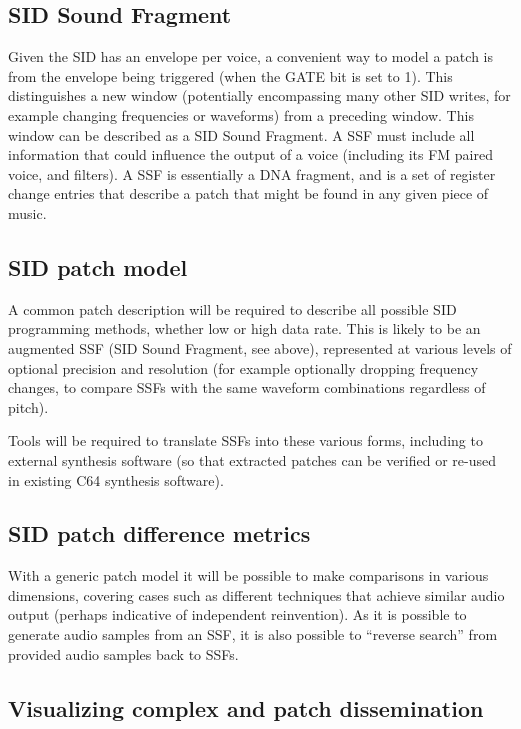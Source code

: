 \documentclass[10pt]{article}
\begin{document}
\begin{multicols*}{2}
\subsection{SID Sound Fragment}
\label{ssf}

Given the SID has an envelope per voice, a convenient way to model a patch is from the envelope being triggered (when the GATE bit is set to 1). This distinguishes a new window (potentially encompassing many other SID writes, for example changing frequencies or waveforms) from a preceding window. This window can be described as a SID Sound Fragment. A SSF must include all information that could influence the output of a voice (including its FM paired voice, and filters). A SSF is essentially a DNA fragment, and is a set of register change entries that describe a patch that might be found in any given piece of music.

\subsection{SID patch model}

A common patch description will be required to describe all possible SID programming methods, whether low or high data rate. This is likely to be an augmented SSF (SID Sound Fragment, see above), represented at various levels of optional precision and resolution (for example optionally dropping frequency changes, to compare SSFs with the same waveform combinations regardless of pitch).

Tools will be required to translate SSFs into these various forms, including to external synthesis software (so that extracted patches can be verified or re-used in existing C64 synthesis software).

\subsection{SID patch difference metrics}

With a generic patch model it will be possible to make comparisons in various dimensions, covering cases such as different techniques that achieve similar audio output (perhaps indicative of independent reinvention). As it is possible to generate audio samples from an SSF, it is also possible to “reverse search” from provided audio samples back to SSFs.

\subsection{Visualizing complex and patch dissemination}


\end{multicols*}
\end{document}
